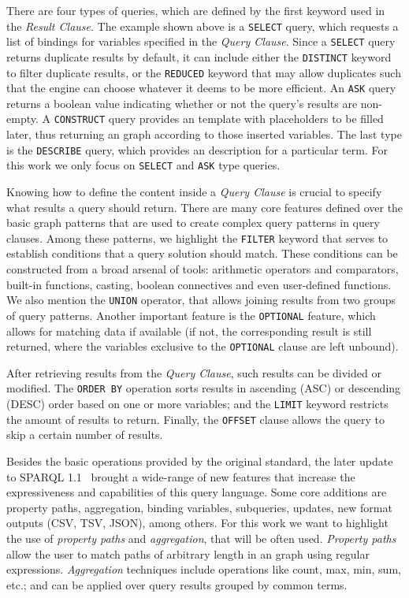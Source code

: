 There are four types of \SPARQL{} queries, which are defined by the first keyword used in the 
\textit{Result Clause}. The example shown above is a \texttt{SELECT} query, which requests a list 
of bindings for variables specified in the \textit{Query Clause}. Since a \texttt{SELECT} query 
returns duplicate results by default, it can include either the \texttt{DISTINCT} keyword to filter 
duplicate results, or the \texttt{REDUCED} keyword that may allow duplicates such that the engine 
can choose whatever it deems to be more efficient. An \texttt{ASK} query returns a boolean value 
indicating whether or not the query’s results are non-empty. A \texttt{CONSTRUCT} query provides 
an \RDF{} template with placeholders to be filled later, thus returning an \RDF{} graph according to 
those inserted variables. The last type is the \texttt{DESCRIBE} query, which provides an \RDF{} 
description for a particular \RDF{} term. For this work we only focus on \texttt{SELECT} and 
\texttt{ASK} type queries.

Knowing how to define the content inside a \textit{Query Clause} is crucial to specify what results 
a \SPARQL{} query should return. There are many core features defined over the basic graph patterns 
that are used to create complex query patterns in query clauses. Among these patterns, we highlight 
the \texttt{FILTER} keyword that serves to establish conditions that a query solution should match. 
These conditions can be constructed from a broad arsenal of tools: arithmetic operators and 
comparators, built-in functions, casting, boolean connectives and even user-defined functions. 
We also mention the \texttt{UNION} operator, that allows joining results from two groups of query 
patterns. Another important feature is the \texttt{OPTIONAL} feature, which allows for matching 
data if available (if not, the corresponding result is still returned, where the variables 
exclusive to the \texttt{OPTIONAL} clause are left unbound).

After retrieving results from the \textit{Query Clause}, such results can be divided or modified. 
The \texttt{ORDER BY} operation sorts results in ascending (ASC) or descending (DESC) order based 
on one or more variables; and the \texttt{LIMIT} keyword restricts the amount of results to return. 
Finally, the \texttt{OFFSET} clause allows the query to skip a certain number of results.

Besides the basic operations provided by the original \SPARQL{} standard, the later update to 
SPARQL 1.1~\cite{key:sparql11} brought a wide-range of new features that increase the expressiveness 
and capabilities of this query language. Some core additions are property paths, aggregation, 
binding variables, subqueries, updates, new format outputs (CSV, TSV, JSON), among others. 
For this work we want to highlight the use of \textit{property paths} and \textit{aggregation}, 
that will be often used. \textit{Property paths} allow the user to match paths of arbitrary 
length in an \RDF{} graph using regular expressions. \textit{Aggregation} techniques include 
operations like count, max, min, sum, etc.; and can be applied over query results grouped 
by common terms.

